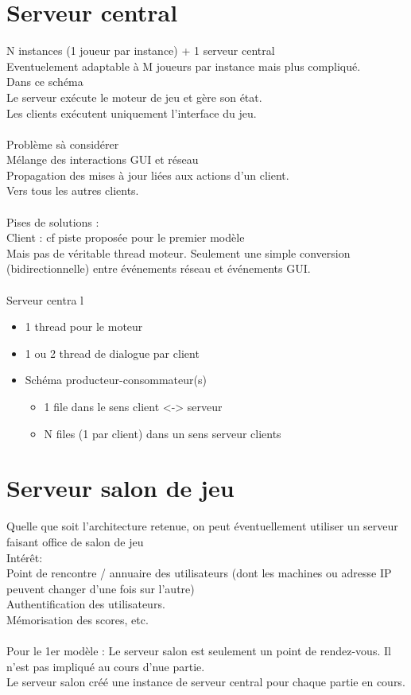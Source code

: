 \documentclass{article}
\begin{document}
\section{Serveur central}
N instances (1 joueur par instance) + 1 serveur central\\
Eventuelement adaptable à M joueurs par instance mais plus compliqué.\\
Dans ce schéma\\
Le serveur exécute le moteur de jeu et gère son état.\\
Les clients exécutent uniquement l'interface du jeu.\\
\\
Problème sà considérer\\
Mélange des interactions GUI et réseau
\\ Propagation des mises à jour liées aux actions d'un client.\\
Vers tous les autres clients.\\
\\
Pises de solutions :\\
Client : cf piste proposée pour le premier modèle\\
Mais pas de véritable thread moteur. Seulement une simple conversion (bidirectionnelle) entre événements réseau et événements GUI.\\\\
Serveur centra l
\begin{itemize}
\item 1 thread pour le moteur
\item 1 ou 2 thread de dialogue par client
\item Schéma producteur-consommateur(s)
\begin{itemize}
\item 1 file dans le sens client <-> serveur
\item N files (1 par client) dans un sens serveur clients
\end{itemize}
\end{itemize}

\section{Serveur salon de jeu}
Quelle que soit l'architecture retenue, on peut éventuellement utiliser un serveur faisant office de salon de jeu\\
Intérêt: \\
Point de rencontre / annuaire des utilisateurs (dont les machines ou adresse IP peuvent changer d'une fois sur l'autre)\\
Authentification des utilisateurs.\\
Mémorisation des scores, etc.
\\
\\
Pour le 1er modèle : 
Le serveur salon est seulement un point de rendez-vous. Il n'est pas impliqué au cours d'nue partie. \\
Le serveur salon créé une instance de serveur central pour chaque partie en cours.
\end{document}
